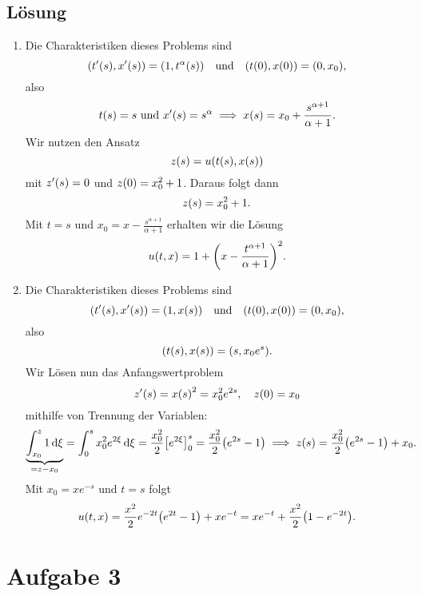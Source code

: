 \documentclass{exercise}
\begin{document}
    \subsection*{Lösung}
    \begin{enumerate}
        \item Die Charakteristiken dieses Problems sind
        \[
            \parentheses*{t'\parentheses*{s}, x'\parentheses*{s}} = \parentheses*{1, t^\alpha\parentheses*{s}} \quad \text{und} \quad \parentheses*{t\parentheses*{0}, x\parentheses*{0}} = \parentheses*{0, x_0},
        \]
        also
        \[
            t\parentheses*{s} = s\text{ und }x'\parentheses*{s} = s^\alpha \implies x\parentheses*{s} = x_0 + \frac{s^{\alpha + 1}}{\alpha + 1}.
        \]
        Wir nutzen den Ansatz
        \[
            z\parentheses*{s} = u\parentheses*{t\parentheses*{s}, x\parentheses*{s}}
        \]
        mit \(z'\parentheses*{s} = 0\) und \(z\parentheses*{0} = x_0^2 + 1\).
        Daraus folgt dann
        \[
            z\parentheses*{s} = x_0^2 + 1.
        \]
        Mit \(t = s\) und \(x_0 = x - \frac{s^{\alpha + 1}}{\alpha + 1}\) erhalten wir die Lösung
        \[
            u\parentheses*{t, x} = 1 + \parentheses*{x - \frac{t^{\alpha + 1}}{\alpha + 1}}^2.
        \]
        \item Die Charakteristiken dieses Problems sind
        \[
            \parentheses*{t'\parentheses*{s}, x'\parentheses*{s}} = \parentheses*{1, x\parentheses*{s}} \quad \text{und} \quad \parentheses*{t\parentheses*{0}, x\parentheses*{0}} = \parentheses*{0, x_0},
        \]
        also
        \[
            \parentheses*{t\parentheses*{s}, x\parentheses*{s}} = \parentheses*{s, x_0 e^s}.
        \]
        Wir Lösen nun das Anfangswertproblem
        \[
            z'\parentheses*{s} = x\parentheses*{s}^2 = x_0^2 e^{2s}, \quad z\parentheses*{0} = x_0
        \]
        mithilfe von Trennung der Variablen:
        \[
            \underbrace{\int_{x_0}^z 1\d\xi}_{= z - x_0} = \int_0^s x_0^2 e^{2\xi}\d\xi = \frac{x_0^2}{2}\brackets*{e^{2\xi}}_0^s = \frac{x_0^2}{2}\parentheses*{e^{2s} - 1} \implies z\parentheses*{s} = \frac{x_0^2}{2}\parentheses*{e^{2s} - 1} + x_0.
        \]
        Mit \(x_0 = xe^{-s}\) und \(t = s\) folgt
        \[
            u\parentheses*{t, x} = \frac{x^2}{2}e^{-2t}\parentheses*{e^{2t} - 1} + xe^{-t} = xe^{-t} + \frac{x^2}{2}\parentheses*{1 - e^{-2t}}.
        \]
    \end{enumerate}


    \section*{Aufgabe 3}
    
\end{document}
